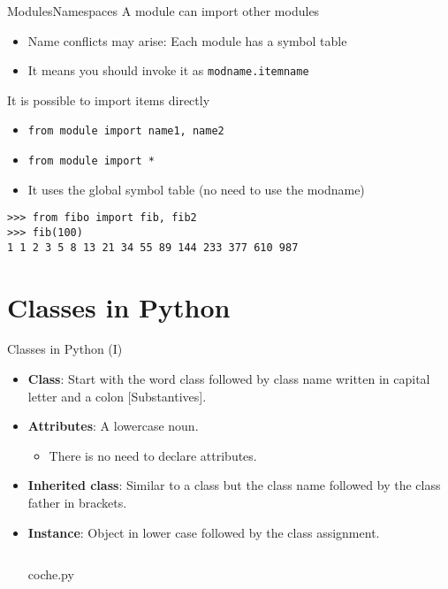 \documentclass[10pt,compress]{beamer} %
\begin{document}
\begin{frame}[fragile]{Modules}{Namespaces}
	A module can import other modules
		\begin{itemize}
		\item Name conflicts may arise: Each module has a symbol table
		\item It means you should invoke it as \texttt{modname.itemname}
		\end{itemize}
 	It is possible to import items directly
		\begin{itemize}
		\item \texttt{from module import name1, name2}
		\item \texttt{from module import *}
		\item It uses the global symbol table (no need to use the modname)
			\end{itemize}
	
	\begin{block}{}
	\begin{verbatim}
>>> from fibo import fib, fib2
>>> fib(100)
1 1 2 3 5 8 13 21 34 55 89 144 233 377 610 987
\end{verbatim}
	\end{block}
\end{frame}

\section{Classes in Python}

\begin{frame}{Classes in Python (I)}
\vspace{-0.2cm}
\begin{itemize}			
		\item \small{\textbf{Class}: Start with the word \alert{class} followed by class name written in \alert{capital letter} and a colon [Substantives].}
		\item \small{\textbf{Attributes}: A lowercase noun.}
		\begin{itemize}
		\item \footnotesize{There is no need to declare attributes.}
		\end{itemize}
		
		\item \small{\textbf{Inherited class}: Similar to a class but the class name followed by the class father in brackets.}
		\item \small{\textbf{Instance}: Object in lower case followed by the class assignment.}
			\vspace{-0.2cm} 
  	   \begin{columns}
			\begin{block}{\small{coche.py}}
			\vspace{-0.3cm} 
				\vspace{-0.2cm} 
			\end{block}
	\end{columns}		
\end{itemize}			
\end{frame}
\end{document}
